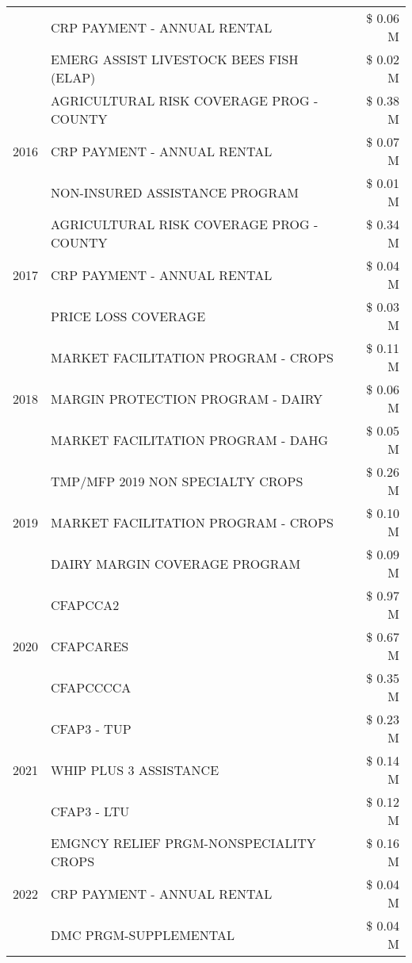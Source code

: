 \begin{tabular}{llr}
 & CRP PAYMENT - ANNUAL RENTAL & \$ 0.06 M \\
 & EMERG ASSIST LIVESTOCK BEES FISH (ELAP) & \$ 0.02 M \\
\cline{1-3}
\multirow[t]{3}{*}{2016} & AGRICULTURAL RISK COVERAGE PROG - COUNTY & \$ 0.38 M \\
 & CRP PAYMENT - ANNUAL RENTAL & \$ 0.07 M \\
 & NON-INSURED ASSISTANCE PROGRAM & \$ 0.01 M \\
\cline{1-3}
\multirow[t]{3}{*}{2017} & AGRICULTURAL RISK COVERAGE PROG - COUNTY & \$ 0.34 M \\
 & CRP PAYMENT - ANNUAL RENTAL & \$ 0.04 M \\
 & PRICE LOSS COVERAGE & \$ 0.03 M \\
\cline{1-3}
\multirow[t]{3}{*}{2018} & MARKET FACILITATION PROGRAM - CROPS & \$ 0.11 M \\
 & MARGIN PROTECTION PROGRAM - DAIRY & \$ 0.06 M \\
 & MARKET FACILITATION PROGRAM - DAHG & \$ 0.05 M \\
\cline{1-3}
\multirow[t]{3}{*}{2019} & TMP/MFP 2019 NON SPECIALTY CROPS & \$ 0.26 M \\
 & MARKET FACILITATION PROGRAM - CROPS & \$ 0.10 M \\
 & DAIRY MARGIN COVERAGE PROGRAM & \$ 0.09 M \\
\cline{1-3}
\multirow[t]{3}{*}{2020} & CFAPCCA2 & \$ 0.97 M \\
 & CFAPCARES & \$ 0.67 M \\
 & CFAPCCCCA & \$ 0.35 M \\
\cline{1-3}
\multirow[t]{3}{*}{2021} & CFAP3 - TUP & \$ 0.23 M \\
 & WHIP PLUS 3 ASSISTANCE & \$ 0.14 M \\
 & CFAP3 - LTU & \$ 0.12 M \\
\cline{1-3}
\multirow[t]{3}{*}{2022} & EMGNCY RELIEF PRGM-NONSPECIALITY CROPS & \$ 0.16 M \\
 & CRP PAYMENT - ANNUAL RENTAL & \$ 0.04 M \\
 & DMC PRGM-SUPPLEMENTAL & \$ 0.04 M \\
\cline{1-3}
\bottomrule
\end{tabular}
